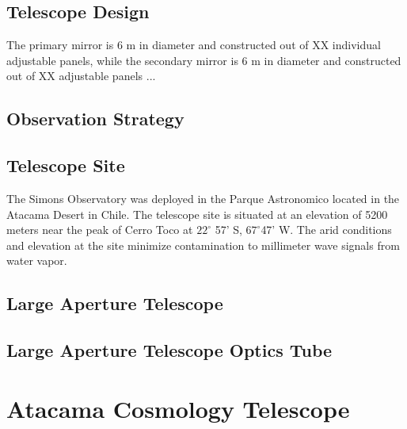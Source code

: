 \subsection{Telescope Design}

The primary mirror is 6 m in diameter and constructed out of XX individual adjustable panels, while the secondary mirror is 6 m in diameter and constructed out of XX adjustable panels \cite{gali18}...
\subsection{Observation Strategy}
\subsection{Telescope Site}

The Simons Observatory was deployed in the Parque Astronomico located in the Atacama Desert in Chile. The telescope site is situated at an elevation of 5200 meters near the peak of Cerro Toco at $22 ^\circ$ 57' S, $67^\circ$47' W. The arid conditions and elevation at the site minimize contamination to millimeter wave signals from water vapor. 

\subsection{Large Aperture Telescope}
\subsection{Large Aperture Telescope Optics Tube}

\section{Atacama Cosmology Telescope}
